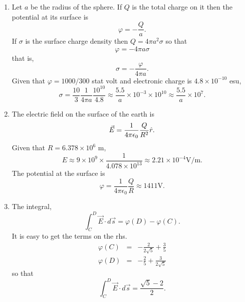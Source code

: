 \documentclass{article}
\begin{document}
\begin{enumerate}
\item Let $a$ be the radius of the sphere. If $Q$ is the total charge on it then
the potential at its surface is
\[
\varphi = -\frac{Q}{a}.
\]
If $\sigma$ is the surface charge density then $Q = 4\pi a^2\sigma$ so that
\[
\varphi = -4\pi a\sigma
\]
that is,
\[
\sigma = -\frac{\varphi}{4\pi a}.
\]
Given that $\varphi = 1000/300$ stat volt and electronic charge is $4.8 \times
10^{-10}$ esu, 
\[
\sigma = \frac{10}{3}\frac{1}{4\pi a}\frac{10^{10}}{4.8} \approx 
\frac{5.5}{a} \times 10^{-3} \times 10^{10} \approx \frac{5.5}{a} \times 10^7.
\]

\item The electric field on the surface of the earth is
\[
\vec{E} = \frac{1}{4\pi\epsilon_0}\frac{Q}{R^2}\hat{r}.
\]
Given that $R = 6.378 \times 10^6$ m,
\[
E \approx 9 \times 10^9 \times \frac{1}{4.078 \times 10^{13}} 
\approx 2.21 \times 10^{-4} \text{V/m}.
\]
The potential at the surface is
\[
\varphi = \frac{1}{4\pi\epsilon_0}\frac{Q}{R} \approx 1411 \text{V}.
\]

\item The integral,
\[
\int_C^D\vec{E}\cdot d\vec{s} = \varphi(D) - \varphi(C).
\]
It is easy to get the terms on the rhs.
\begin{eqnarray}
\varphi(C) &=& -\frac{2}{2\sqrt{5}} + \frac{3}{5} \label{e16} \\
\varphi(D) &=& -\frac{2}{5} + \frac{3}{2\sqrt{5}} \label{e17}
\end{eqnarray}
so that
\[
\int_C^D\vec{E}\cdot d\vec{s} = \frac{\sqrt{5} - 2}{2}.
\]


\end{enumerate}
\end{document}
